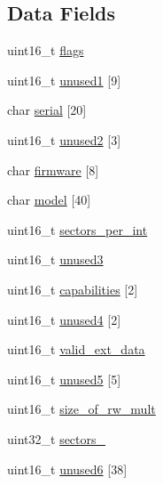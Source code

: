 \subsection*{Data Fields}
\begin{DoxyCompactItemize}
\item 
uint16\+\_\+t \hyperlink{struct____attribute_____aa0943b75cfebf20ce431adfbedf9f8c4}{flags}
\item 
uint16\+\_\+t \hyperlink{struct____attribute_____a8d815909cef8ca1b062a2ad96c660a9c}{unused1} \mbox{[}9\mbox{]}
\item 
char \hyperlink{struct____attribute_____af239f8158f86e02086ba58fd19b81da7}{serial} \mbox{[}20\mbox{]}
\item 
uint16\+\_\+t \hyperlink{struct____attribute_____a18f24001adf4149e889ed86a8cbaff54}{unused2} \mbox{[}3\mbox{]}
\item 
char \hyperlink{struct____attribute_____adad0e454dd0c9a6d03d0f4349e9453f8}{firmware} \mbox{[}8\mbox{]}
\item 
char \hyperlink{struct____attribute_____a0f032985bf7b712101efd1179aa4bf9f}{model} \mbox{[}40\mbox{]}
\item 
uint16\+\_\+t \hyperlink{struct____attribute_____a98a71d598e8fa28b0bec4f638bef0c4d}{sectors\+\_\+per\+\_\+int}
\item 
uint16\+\_\+t \hyperlink{struct____attribute_____a5e3c3ed46d04f2818d5d3edcf9b0300f}{unused3}
\item 
uint16\+\_\+t \hyperlink{struct____attribute_____a77a668765fcd25abfe5b7e5f4ee85108}{capabilities} \mbox{[}2\mbox{]}
\item 
uint16\+\_\+t \hyperlink{struct____attribute_____a0b098ce1ed9de8d4a04ebb0868821517}{unused4} \mbox{[}2\mbox{]}
\item 
uint16\+\_\+t \hyperlink{struct____attribute_____a97f810c4d498d2027968fc454a7f7edd}{valid\+\_\+ext\+\_\+data}
\item 
uint16\+\_\+t \hyperlink{struct____attribute_____a7ba552a7e1c4b9a14f34db29c9804f78}{unused5} \mbox{[}5\mbox{]}
\item 
uint16\+\_\+t \hyperlink{struct____attribute_____aff51436bd7bae12814f39dfdb34da0a9}{size\+\_\+of\+\_\+rw\+\_\+mult}
\item 
uint32\+\_\+t \hyperlink{struct____attribute_____a18dddf5fb27b047a1d7b9c0646d341dd}{sectors\+\_}
\item 
uint16\+\_\+t \hyperlink{struct____attribute_____a2237e6caea302218050257b393aca1c8}{unused6} \mbox{[}38\mbox{]}
\item 

\end{DoxyCompactItemize}
